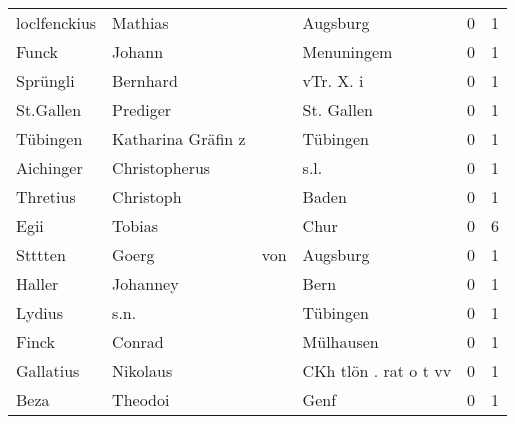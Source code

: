 \begin{tabular}{llllrr}
             loclfenckius &                            Mathias &             &                                    Augsburg &          0 &         1 \\
                    Funck &                             Johann &             &                                  Menuningem &          0 &         1 \\
                 Sprüngli &                           Bernhard &             &                                   vTr. X. i &          0 &         1 \\
                St.Gallen &                           Prediger &             &                                  St. Gallen &          0 &         1 \\
                 Tübingen &                 Katharina Gräfin z &             &                                    Tübingen &          0 &         1 \\
                Aichinger &                      Christopherus &             &                                        s.l. &          0 &         1 \\
                 Thretius &                          Christoph &             &                                       Baden &          0 &         1 \\
                     Egii &                             Tobias &             &                                        Chur &          0 &         6 \\
                  Stttten &                              Goerg &         von &                                    Augsburg &          0 &         1 \\
                   Haller &                           Johanney &             &                                        Bern &          0 &         1 \\
                   Lydius &                               s.n. &             &                                    Tübingen &          0 &         1 \\
                    Finck &                             Conrad &             &                                   Mülhausen &          0 &         1 \\
                Gallatius &                           Nikolaus &             &                       CKh tlön . rat o t vv &          0 &         1 \\
                     Beza &                            Theodoi &             &                                        Genf &          0 &         1 \\

\end{tabular}
